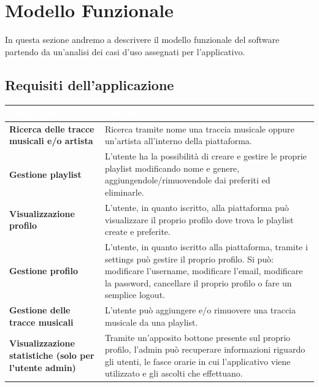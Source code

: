 \documentclass{article}
\begin{document}
	\section{Modello Funzionale}
	In questa sezione andremo a descrivere il modello funzionale del software partendo da un'analisi dei casi d'uso assegnati per l'applicativo.
		\subsection{Requisiti dell'applicazione}
		\begin{tabular}{|p{6cm}|p{8cm}|}
			\hline
			\cellcolor{dark_purple}\textcolor{white}{\textbf{Funzionalità}} & \cellcolor{dark_purple}\textcolor{white}{\textbf{Descrizione}} \\
			\hline
			\textbf{Ricerca delle tracce musicali e/o artista} & Ricerca tramite nome una traccia musicale oppure un'artista all'interno della piattaforma. \\
			\hline
			\textbf{Gestione playlist} & L'utente ha la possibilità di creare e gestire le proprie playlist modificando nome e genere, aggiungendole/rimuovendole dai preferiti ed eliminarle. \\
			\hline
			\textbf{Visualizzazione profilo} & L'utente, in quanto iscritto, alla piattaforma può visualizzare il proprio profilo dove trova le playlist create e preferite. \\
			\hline
			\textbf{Gestione profilo} & L'utente, in quanto iscritto alla piattaforma, tramite i settings può gestire il proprio profilo. Si può: modificare l'username, modificare l'email, modificare la password, cancellare il proprio profilo o fare un semplice logout. \\
			\hline
			\textbf{Gestione delle tracce musicali} & L'utente può aggiungere e/o rimuovere una traccia musicale da una playlist. \\
			\hline
			\textbf{Visualizzazione statistiche (solo per l'utente admin)} & Tramite un'apposito bottone presente sul proprio profilo, l'admin può recuperare informazioni riguardo gli utenti, le fasce orarie in cui l'applicativo viene utilizzato e gli ascolti che effettuano. \\
			\hline
		\end{tabular}
\end{document}
